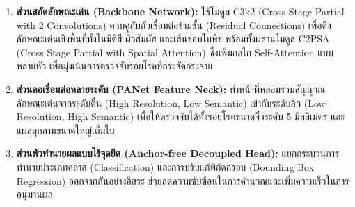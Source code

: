 \begin{enumerate}
    \item \textbf{ส่วนสกัดลักษณะเด่น (Backbone Network):} ใช้โมดูล C3k2 (Cross Stage Partial with 2 Convolutions) ควบคู่กับตัวเชื่อมต่อข้ามขั้น (Residual Connections) เพื่อดึงลักษณะเด่นเชิงพื้นที่ทั้งในมิติสี ผิวสัมผัส และเส้นขอบใบพืช พร้อมทั้งผสานโมดูล C2PSA (Cross Stage Partial with Spatial Attention) ซึ่งเพิ่มกลไก Self-Attention แบบหลายหัว เพื่อมุ่งเน้นการตรวจจับรอยโรคที่กระจัดกระจาย
    \item \textbf{ส่วนคอเชื่อมต่อหลายระดับ (PANet Feature Neck):} ทำหน้าที่หลอมรวมสัญญาณลักษณะเด่นจากระดับตื้น (High Resolution, Low Semantic) เข้ากับระดับลึก (Low Resolution, High Semantic) เพื่อให้ตรวจจับได้ทั้งรอยโรคขนาดจิ๋วระดับ 5 มิลลิเมตร และแผลลุกลามขนาดใหญ่เต็มใบ
    \item \textbf{ส่วนหัวทำนายผลแบบไร้จุดยึด (Anchor-free Decoupled Head):} แยกกระบวนการทำนายประเภทคลาส (Classification) และการปรับแก้พิกัดกรอบ (Bounding Box Regression) ออกจากกันอย่างอิสระ ช่วยลดความซับซ้อนในการคำนวณและเพิ่มความเร็วในการอนุมานผล
\end{enumerate}

